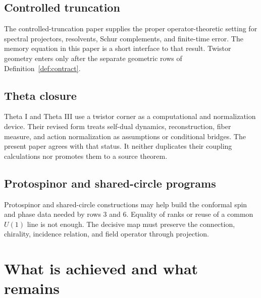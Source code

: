 \documentclass[11pt]{article}
\begin{document}
\subsection{Controlled truncation}

The controlled-truncation paper supplies the proper operator-theoretic
setting for spectral projectors, resolvents, Schur complements, and
finite-time error. The memory equation in this paper is a short interface to
that result. Twistor geometry enters only after the separate geometric rows
of Definition~\ref{def:contract}.

\subsection{Theta closure}

Theta I and Theta III use a twistor corner as a computational and
normalization device. Their revised form treats self-dual dynamics,
reconstruction, fiber measure, and action normalization as assumptions or
conditional bridges. The present paper agrees with that status. It neither
duplicates their coupling calculations nor promotes them to a source
theorem.

\subsection{Protospinor and shared-circle programs}

Protospinor and shared-circle constructions may help build the conformal
spin and phase data needed by rows 3 and 6. Equality of ranks or reuse of a
common \(U(1)\) line is not enough. The decisive map must preserve the
connection, chirality, incidence relation, and field operator through
projection.

\section{What is achieved and what remains}
\end{document}
